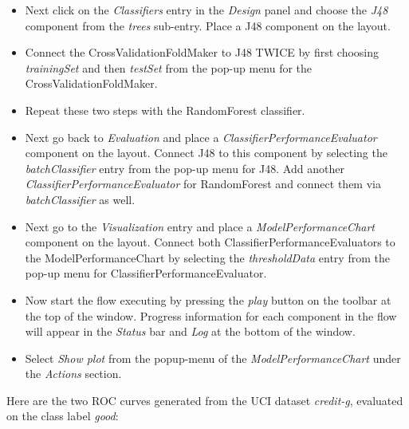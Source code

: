 \begin{itemize}
	\item Next click on the \textit{Classifiers} entry in the
          \textit{Design} panel and choose the \textit{J48} component
          from the \textit{trees} sub-entry. Place a J48 component on
          the layout.

	\item Connect the CrossValidationFoldMaker to J48 TWICE by first choosing
	\textit{trainingSet} and then \textit{testSet} from the pop-up menu for the
	CrossValidationFoldMaker.

	\item Repeat these two steps with the RandomForest classifier.

	\item Next go back to \textit{Evaluation} and place a
	\textit{ClassifierPerformanceEvaluator} component on the layout. Connect J48
	to this component by selecting the \textit{batchClassifier} entry from the
	pop-up menu for J48. Add another \textit{ClassifierPerformanceEvaluator} for
	RandomForest and connect them via \textit{batchClassifier} as well.

	\item Next go to the \textit{Visualization} entry and place a 
	\textit{ModelPerformanceChart} component on the layout. Connect both 
	ClassifierPerformanceEvaluators to the ModelPerformanceChart by selecting 
	the \textit{thresholdData} entry from the pop-up menu for ClassifierPerformanceEvaluator.

	\item Now start the flow executing by pressing the
          \textit{play} button on the toolbar at the top of the
          window. Progress information for each component in the flow
          will appear in the \textit{Status} bar and \textit{Log} at
          the bottom of the window.
	
	\item Select \textit{Show plot} from the popup-menu of the 
	\textit{ModelPerformanceChart} under the \textit{Actions} section.
\end{itemize}

Here are the two ROC curves generated from the UCI dataset \textit{credit-g}, 
evaluated on the class label \textit{good}:

\begin{center}
\end{center}


